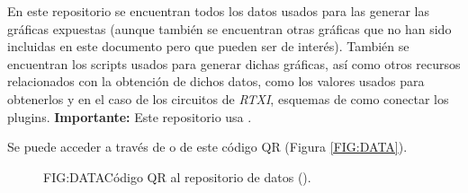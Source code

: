 
En este repositorio se encuentran todos los datos usados para las generar las gráficas expuestas (aunque también se encuentran otras gráficas que no han sido incluidas en este documento pero que pueden ser de interés). También se encuentran los scripts usados para generar dichas gráficas, así como otros recursos relacionados con la obtención de dichos datos, como los valores usados para obtenerlos y en el caso de los circuitos de \textit{RTXI}, esquemas de como conectar los plugins. \textbf{Importante:} Este repositorio usa . 

Se puede acceder a través de  o de este código QR (Figura \ref{FIG:DATA}).

\begin{figure}[QR repositorio de datos]{FIG:DATA}{Código QR al repositorio de datos ().
}
\end{figure}
